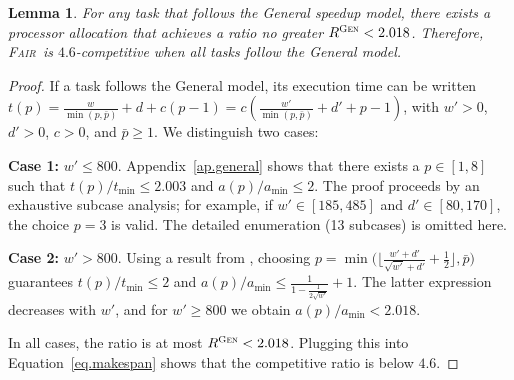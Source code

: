 \documentclass{article}
\newtheorem{lemma}{Lemma}
\newcommand\fair{\textsc{Fair}\xspace}
\newcommand\GEN{\textsc{Gen}\xspace}
\begin{document}
\begin{lemma}\label{lem.general}
For any task that follows the General speedup model, there exists a processor allocation that achieves a ratio no greater $R^{\GEN}<2.018$. Therefore, \fair\ is $4.6$-competitive when all tasks follow the General model.
\end{lemma}

\begin{proof}
If a task follows the General model, its execution time can be written
$t(p) = \frac{w}{\min(p, \bar{p})} + d + c (p-1)
       = c\!\left( \frac{w'}{\min(p, \bar{p})} + d' + p - 1 \right)$,
with $w'>0$, $d'>0$, $c>0$, and $\bar{p}\ge 1$.
We distinguish two cases:

\textbf{Case 1:} $w' \le 800$.  
      Appendix~\ref{ap.general} shows that there exists a $p\in[1,8]$ such that
      $t(p)/t_{\min}\le 2.003$ and $a(p)/a_{\min}\le 2$.
      The proof proceeds by an exhaustive subcase analysis; for example,
      if $w' \in [185,485]$ and $d' \in [80,170]$, the choice $p=3$ is valid.
      The detailed enumeration (13 subcases) is omitted here.

 \textbf{Case 2:} $w' > 800$.  
      Using a result from \cite{TOPC24}, choosing
      $p=\min\!\bigl(\lfloor \tfrac{w'+d'}{\sqrt{w'}+d'} + \tfrac12\rfloor,\bar{p}\bigr)$
      guarantees $t(p)/t_{\min}\le 2$ and
      $a(p)/a_{\min}\le \frac{1}{1-\frac{1}{2\sqrt{w'}}}+1$.
      The latter expression decreases with $w'$, and for $w'\ge 800$ we obtain
      $a(p)/a_{\min}<2.018$.


In all cases, the ratio is at most $R^{\GEN}<2.018$.
Plugging this into Equation~\ref{eq.makespan} shows that the competitive
ratio is below $4.6$.
\end{proof}
\end{document}
